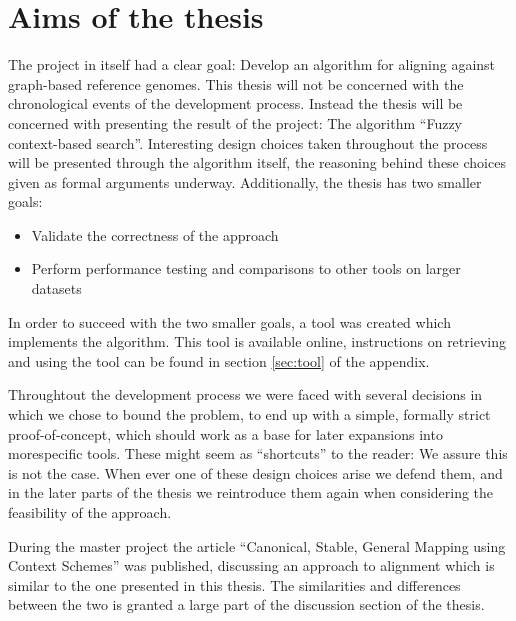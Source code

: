 \documentclass[thesis.tex]{subfiles}
\begin{document}
\section{Aims of the thesis}
The project in itself had a clear goal: Develop an algorithm for aligning against graph-based reference genomes. This thesis will not be concerned with the chronological events of the development process. Instead the thesis will be concerned with presenting the result of the project: The algorithm ``Fuzzy context-based search''. Interesting design choices taken throughout the process will be presented through the algorithm itself, the reasoning behind these choices given as formal arguments underway. Additionally, the thesis has two smaller goals:
\begin{itemize}
  \item Validate the correctness of the approach
  \item Perform performance testing and comparisons to other tools on larger datasets
\end{itemize}
In order to succeed with the two smaller goals, a tool was created which implements the algorithm. This tool is available online, instructions on retrieving and using the tool can be found in section \ref{sec:tool} of the appendix.\\
\par\noindent
Throughtout the development process we were faced with several decisions in which we chose to bound the problem, to end up with a simple, formally strict proof-of-concept, which should work as a base for later expansions into morespecific tools. These might seem as ``shortcuts'' to the reader: We assure this is not the case. When ever one of these design choices arise we defend them, and in the later parts of the thesis we reintroduce them again when considering the feasibility of the approach.\\
\par\noindent
During the master project the article ``Canonical, Stable, General Mapping using Context Schemes'' was published, discussing an approach to alignment which is similar to the one presented in this thesis. The similarities and differences between the two is granted a large part of the discussion section of the thesis.
\end{document}

